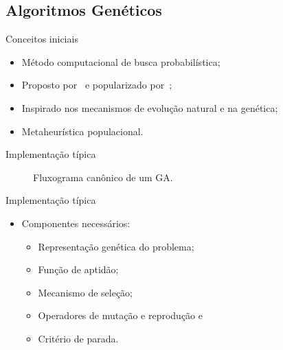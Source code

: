 \documentclass{beamer}
\begin{document}
\subsection{Algoritmos Genéticos}

\begin{frame}{Conceitos iniciais}
  \begin{itemize}
    \item Método computacional de busca probabilística;
    \vspace{0.5em}
    \item Proposto por~ e popularizado por~;
    \vspace{0.5em}
    \item Inspirado nos mecanismos de evolução natural e na genética;
    \vspace{0.5em}
    \item Metaheurística populacional.
    \vspace{0.5em}
  \end{itemize}
\end{frame}

\begin{frame}{Implementação típica}
  \begin{figure}[H]
    \begin{center}  
    \end{center}
    \caption{Fluxograma canônico de um GA.}
  \end{figure}
\end{frame}

\begin{frame}[noframenumbering]{Implementação típica}
  \begin{itemize}
    \item Componentes necessários:
      \begin{itemize}
        \item Representação genética do problema; 
        \item Função de aptidão;
        \item Mecanismo de seleção; 
        \item Operadores de mutação e reprodução e
        \item Critério de parada.
      \end{itemize}
  \end{itemize}
\end{frame}
\end{document}
